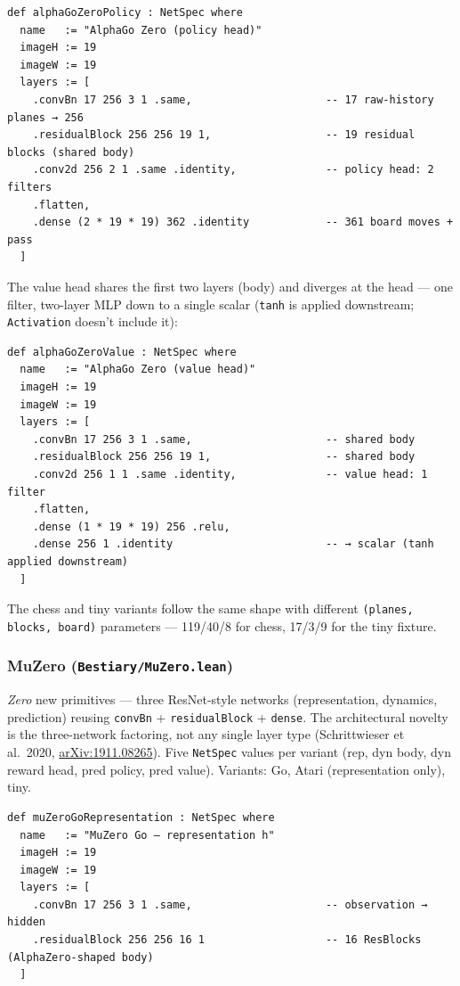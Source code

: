 \begin{verbatim}
def alphaGoZeroPolicy : NetSpec where
  name   := "AlphaGo Zero (policy head)"
  imageH := 19
  imageW := 19
  layers := [
    .convBn 17 256 3 1 .same,                     -- 17 raw-history planes → 256
    .residualBlock 256 256 19 1,                  -- 19 residual blocks (shared body)
    .conv2d 256 2 1 .same .identity,              -- policy head: 2 filters
    .flatten,
    .dense (2 * 19 * 19) 362 .identity            -- 361 board moves + pass
  ]
\end{verbatim}

The value head shares the first two layers (body) and diverges at
the head — one filter, two-layer MLP down to a single scalar
(\texttt{tanh} is applied downstream; \texttt{Activation} doesn't
include it):

\begin{verbatim}
def alphaGoZeroValue : NetSpec where
  name   := "AlphaGo Zero (value head)"
  imageH := 19
  imageW := 19
  layers := [
    .convBn 17 256 3 1 .same,                     -- shared body
    .residualBlock 256 256 19 1,                  -- shared body
    .conv2d 256 1 1 .same .identity,              -- value head: 1 filter
    .flatten,
    .dense (1 * 19 * 19) 256 .relu,
    .dense 256 1 .identity                        -- → scalar (tanh applied downstream)
  ]
\end{verbatim}

The chess and tiny variants follow the same shape with different
\texttt{(planes, blocks, board)} parameters --- 119/40/8 for chess,
17/3/9 for the tiny fixture.

\subsubsection*{MuZero (\texttt{Bestiary/MuZero.lean})}
\emph{Zero} new primitives --- three ResNet-style networks (representation,
dynamics, prediction) reusing \texttt{convBn} + \texttt{residualBlock}
+ \texttt{dense}. The architectural novelty is the three-network
factoring, not any single layer type (Schrittwieser et al.\ 2020,
\href{https://arxiv.org/abs/1911.08265}{arXiv:1911.08265}). Five \texttt{NetSpec} values per
variant (rep, dyn body, dyn reward head, pred policy, pred value).
Variants: Go, Atari (representation only), tiny.

\begin{verbatim}
def muZeroGoRepresentation : NetSpec where
  name   := "MuZero Go — representation h"
  imageH := 19
  imageW := 19
  layers := [
    .convBn 17 256 3 1 .same,                     -- observation → hidden
    .residualBlock 256 256 16 1                   -- 16 ResBlocks (AlphaZero-shaped body)
  ]
\end{verbatim}

